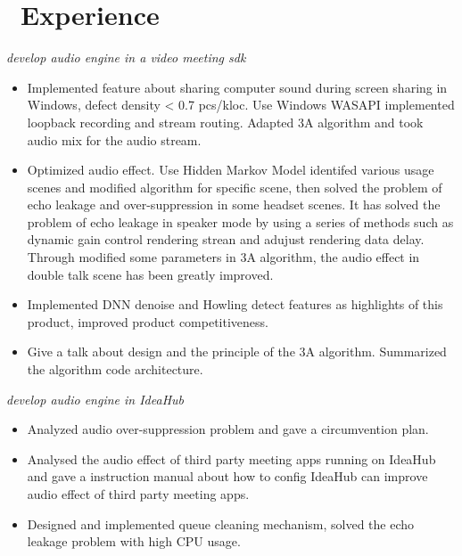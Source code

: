 \documentclass{resume}
\begin{document}
\section{\faBriefcase\ Experience}
\textit{develop audio engine in a video meeting sdk}
\begin{itemize}
  \item Implemented feature about sharing computer sound during screen sharing in Windows, defect density < 0.7 pcs/kloc. Use Windows WASAPI implemented
  loopback recording and stream routing. Adapted 3A algorithm and took audio mix for the audio stream. 
  \item Optimized audio effect. Use Hidden Markov Model identifed various usage scenes and modified algorithm for specific scene,
  then solved the problem of echo leakage and over-suppression in some headset scenes. It has solved the problem of echo leakage in speaker mode by using
  a series of methods such as dynamic gain control rendering strean and adujust rendering data delay.
  Through modified some parameters in 3A algorithm, the audio effect in double talk scene has been greatly improved.
  \item Implemented DNN denoise and Howling detect features as highlights of this product, improved product competitiveness.
  \item Give a talk about design and the principle of the 3A algorithm. Summarized the algorithm code architecture.
\end{itemize}
\textit{develop audio engine in IdeaHub}
\begin{itemize}
  \item Analyzed audio over-suppression problem and gave a circumvention plan.
  \item Analysed the audio effect of third party meeting apps running on IdeaHub and gave a instruction manual about how to config IdeaHub can improve audio effect of third party meeting apps.
  \item Designed and implemented queue cleaning mechanism, solved the echo leakage problem with high CPU usage.
\end{itemize}
\end{document}
